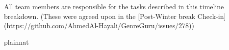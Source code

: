 \documentclass[12pt, titlepage]{article}
\begin{document}
All team members are responsible for the tasks described in this timeline breakdown. (These were agreed upon in the [Post-Winter break Check-in](https://github.com/AhmedAl-Hayali/GenreGuru/issues/278))


 {plainnat}


\newpage{}
\end{document}
